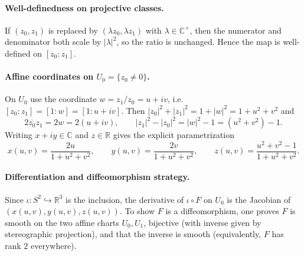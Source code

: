 \documentclass[12pt,a4paper]{article}
\theoremstyle{plain}
\theoremstyle{definition}      %
\begin{document}
\paragraph{Well-definedness on projective classes.}
If $(z_0,z_1)$ is replaced by $(\lambda z_0,\lambda z_1)$ with $\lambda\in\mathbb C^\times$,
then the numerator and denominator both scale by $|\lambda|^2$, so the ratio is unchanged.
Hence the map is well-defined on $[z_0:z_1]$.

\paragraph{Affine coordinates on $U_0=\{z_0\neq 0\}$.}
On $U_0$ use the coordinate $w=z_1/z_0=u+iv$, i.e.\ $[z_0:z_1]=[1:w]=[1:u+iv]$.
Then $|z_0|^2+|z_1|^2=1+|w|^2=1+u^2+v^2$ and
\[
2\overline{z_0}z_1=2w=2(u+iv),
\qquad
|z_1|^2-|z_0|^2=|w|^2-1=(u^2+v^2)-1.
\]
Writing $x+iy\in\mathbb C$ and $z\in\mathbb R$ gives the explicit parametrization
\[
x(u,v)=\frac{2u}{1+u^2+v^2},\qquad
y(u,v)=\frac{2v}{1+u^2+v^2},\qquad
z(u,v)=\frac{u^2+v^2-1}{1+u^2+v^2}.
\]

\paragraph{Differentiation and diffeomorphism strategy.}
Since $\iota:S^2\hookrightarrow\mathbb R^3$ is the inclusion, the derivative of $\iota\circ F$
on $U_0$ is the Jacobian of $(x(u,v),y(u,v),z(u,v))$.
To show $F$ is a diffeomorphism, one proves $F$ is smooth on the two affine charts $U_0,U_1$,
bijective (with inverse given by stereographic projection), and that the inverse is smooth (equivalently, $F$ has rank $2$ everywhere).



\end{document}
